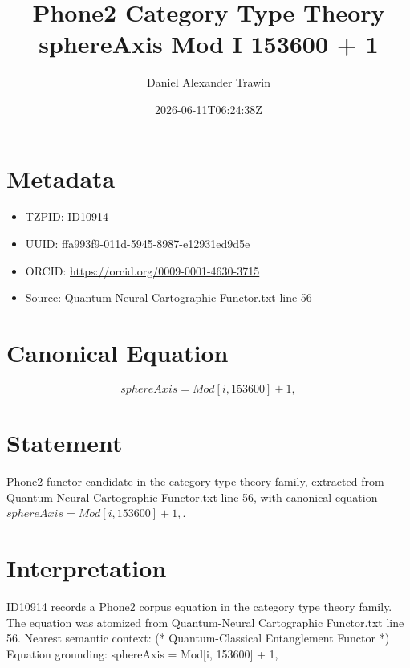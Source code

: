 \documentclass[11pt]{article}
\title{Phone2 Category Type Theory sphereAxis Mod I 153600 + 1}
\author{Daniel Alexander Trawin}
\date{2026-06-11T06:24:38Z}
\begin{document}
\maketitle
\section*{Metadata}
\begin{itemize}
\item TZPID: ID10914
\item UUID: ffa993f9-011d-5945-8987-e12931ed9d5e
\item ORCID: \url{https://orcid.org/0009-0001-4630-3715}
\item Source: Quantum-Neural Cartographic Functor.txt line 56
\end{itemize}
\section*{Canonical Equation}
\[
sphereAxis = Mod[i, 153600] + 1,
\]
\section*{Statement}
Phone2 functor candidate in the category type theory family, extracted from Quantum-Neural Cartographic Functor.txt line 56, with canonical equation $sphereAxis = Mod[i, 153600] + 1,$.
\section*{Interpretation}
ID10914 records a Phone2 corpus equation in the category type theory family. The equation was atomized from Quantum-Neural Cartographic Functor.txt line 56. Nearest semantic context: (* Quantum-Classical Entanglement Functor *) Equation grounding: sphereAxis = Mod[i, 153600] + 1,
\end{document}
